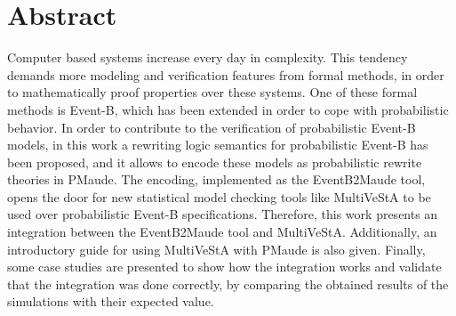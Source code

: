 \chapter*{Abstract}
Computer based systems increase every day in complexity. This tendency demands more modeling and verification features from formal methods, in order to mathematically proof properties over these systems. One of these formal methods is Event-B, which has been extended in order to cope with probabilistic behavior. In order to contribute to the verification of probabilistic Event-B models, in this work a rewriting logic semantics for probabilistic Event-B has been proposed, and it allows to encode these models as probabilistic rewrite theories in PMaude. The encoding, implemented as the EventB2Maude tool, opens the door for new statistical model checking tools like MultiVeStA to be used over probabilistic Event-B specifications. Therefore, this work presents an integration between the EventB2Maude tool and MultiVeStA. Additionally, an introductory guide for using MultiVeStA with PMaude is also given. Finally, some case studies are presented to show how the integration works and validate that the integration was done correctly, by comparing the obtained results of the simulations with their expected value. 